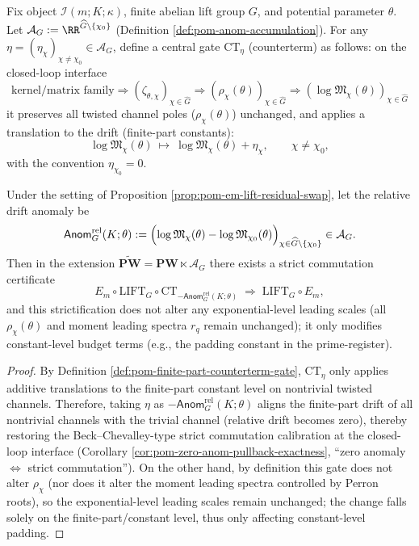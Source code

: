 \begin{definition}\label{def:pom-finite-part-counterterm-gate}
Fix object \(\mathcal{I}(m;K;\kappa)\), finite abelian lift group \(G\), and potential parameter \(\theta\).
Let \(\mathcal{A}_G:=\RR^{\widehat G\setminus\{\chi_0\}}\) (Definition \ref{def:pom-anom-accumulation}).
For any \(\eta=(\eta_\chi)_{\chi\neq\chi_0}\in\mathcal{A}_G\), define a central gate \(\mathrm{CT}_\eta\) (counterterm) as follows: on the closed-loop interface
\[
\text{kernel/matrix family}\Rightarrow (\zeta_{\theta,\chi})_{\chi\in\widehat G}\Rightarrow (\rho_\chi(\theta))_{\chi\in\widehat G}\Rightarrow (\log\mathfrak{M}_\chi(\theta))_{\chi\in\widehat G}
\]
it preserves all twisted channel poles (\(\rho_\chi(\theta)\)) unchanged, and applies a translation to the drift (finite-part constants):
\[
\log\mathfrak{M}_\chi(\theta)\ \mapsto\ \log\mathfrak{M}_\chi(\theta)+\eta_\chi,\qquad \chi\neq\chi_0,
\]
with the convention \(\eta_{\chi_0}=0\).
\end{definition}

\begin{proposition}\label{prop:pom-counterterm-anom-cancel}
Under the setting of Proposition \ref{prop:pom-em-lift-residual-swap}, let the relative drift anomaly be
\[
\mathsf{Anom}^{\mathrm{rel}}_{G}(K;\theta)
:=\Bigl(\log\mathfrak{M}_\chi(\theta)-\log\mathfrak{M}_{\chi_0}(\theta)\Bigr)_{\chi\in\widehat G\setminus\{\chi_0\}}\in\mathcal{A}_G.
\]
Then in the extension \(\widetilde{\mathbf{PW}}=\mathbf{PW}\ltimes\mathcal{A}_G\) there exists a strict commutation certificate
\[
E_m\circ \mathrm{LIFT}_G\circ \mathrm{CT}_{-\mathsf{Anom}^{\mathrm{rel}}_{G}(K;\theta)}
\;\Rightarrow\;
\mathrm{LIFT}_G\circ E_m,
\]
and this strictification does not alter any exponential-level leading scales (all \(\rho_\chi(\theta)\) and moment leading spectra \(r_q\) remain unchanged); it only modifies constant-level budget terms (e.g., the padding constant in the prime-register).
\end{proposition}

\begin{proof}
By Definition \ref{def:pom-finite-part-counterterm-gate}, \(\mathrm{CT}_\eta\) only applies additive translations to the finite-part constant level on nontrivial twisted channels.
Therefore, taking \(\eta\) as \(-\mathsf{Anom}^{\mathrm{rel}}_{G}(K;\theta)\) aligns the finite-part drift of all nontrivial channels with the trivial channel (relative drift becomes zero), thereby restoring the Beck--Chevalley-type strict commutation calibration at the closed-loop interface (Corollary \ref{cor:pom-zero-anom-pullback-exactness}, ``zero anomaly \(\Leftrightarrow\) strict commutation'').
On the other hand, by definition this gate does not alter \(\rho_\chi\) (nor does it alter the moment leading spectra controlled by Perron roots), so the exponential-level leading scales remain unchanged; the change falls solely on the finite-part/constant level, thus only affecting constant-level padding.
\end{proof}

